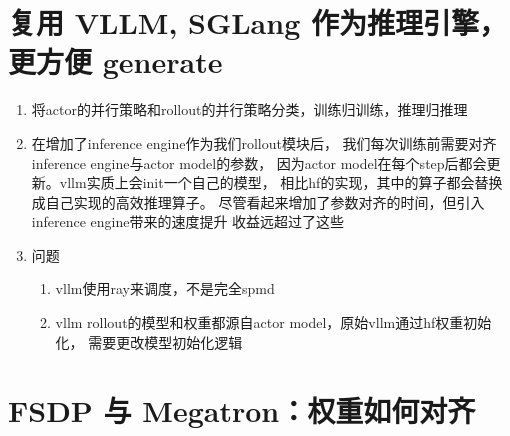 \documentclass[UTF8,fontset=fandol]{ctexart}
\begin{document}
\section{复用 VLLM, SGLang 作为推理引擎，更方便 generate}
\label{sec:inference}

\begin{enumerate}
  \item 将actor的并行策略和rollout的并行策略分类，训练归训练，推理归推理
  \item 在增加了inference engine作为我们rollout模块后，
    我们每次训练前需要对齐inference engine与actor model的参数，
    因为actor model在每个step后都会更新。vllm实质上会init一个自己的模型，
    相比hf的实现，其中的算子都会替换成自己实现的高效推理算子。
    尽管看起来增加了参数对齐的时间，但引入inference engine带来的速度提升
    收益远超过了这些
  \item 问题
  \begin{enumerate}
    \item vllm使用ray来调度，不是完全spmd
    \item vllm rollout的模型和权重都源自actor model，原始vllm通过hf权重初始化，
      需要更改模型初始化逻辑
  \end{enumerate}
\end{enumerate}


\section{FSDP 与 Megatron：权重如何对齐}
\label{sec:align}
\end{document}
